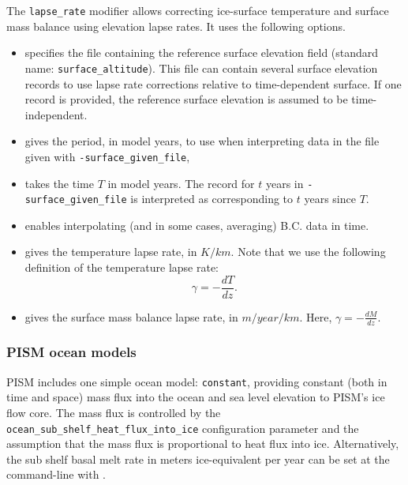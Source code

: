   The \texttt{lapse_rate} modifier allows correcting ice-surface temperature and surface mass balance using elevation lapse rates. It uses the following options.
  \begin{itemize}
  \item {} specifies the file containing the reference surface elevation field (standard name: \texttt{surface_altitude}). This file can contain several surface elevation records to use lapse rate corrections relative to time-dependent surface. If one record is provided, the reference surface elevation is assumed to be time-independent.
  \item {} gives the period, in model years, to use when interpreting data in the file given with \texttt{-surface_given_file},
  \item {} takes the time $T$ in model years. The record for $t$ years in \texttt{-surface_given_file} is interpreted as corresponding to $t$ years since $T$.
  \item {} enables interpolating (and in some cases, averaging) B.C. data in time.
  \item {} gives the temperature lapse rate, in $K/km$. Note that we use the following definition of the temperature lapse rate:
    \begin{displaymath}
      \gamma = -\frac{dT}{dz}.
    \end{displaymath}
  \item {} gives the surface mass balance lapse rate, in $m/year/km$. Here, $\gamma=-\frac{dM}{dz}$.
  \end{itemize}


\subsubsection{PISM ocean models}
\label{sec:pism-ocean-models}

PISM includes one simple ocean model: \texttt{constant}, providing constant (both in time and space) mass flux into the ocean and sea level elevation to PISM's ice flow core. The mass flux is controlled by the\\ \texttt{ocean_sub_shelf_heat_flux_into_ice} configuration parameter and the assumption that the mass flux is proportional to heat flux into ice. Alternatively, the sub shelf basal melt rate in meters ice-equivalent per year can be set at the command-line with .

